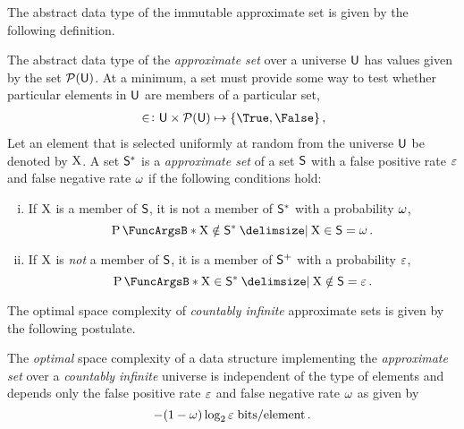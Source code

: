\documentclass[ ../main.tex]{subfiles}
\begin{document}
The abstract data type of the immutable approximate set\cite{aset} is given by the following definition.
\begin{definition}
\label{def:approx_set}
The abstract data type of the \emph{approximate set} over a universe $\Set{U}$ has values given by the set $\PowerSet(\Set{U})$. At a minimum, a set must provide some way to test whether particular elements in $\Set{U}$ are members of a particular set,
\begin{align}
    &\SetContains \colon \Set{U} \times \PowerSet(\Set{U}) \mapsto \{ \True, \False \}\,,\\
\end{align}
Let an element that is selected uniformly at random from the universe $\Set{U}$ be denoted by $\RV{X}$. A set $\ASet{S}$ is a \emph{approximate set} of a set $\Set{S}$ with a false positive rate $\fprate$ and false negative rate $\fnrate$ if the following conditions hold:
\begin{enumerate}[(i)]
    \item If $\RV{X}$ is a member of $\Set{S}$, it is not a member of $\ASet{S}$ with a probability $\fnrate$,
    \begin{equation}
        \Prob{\SetNotContains[\RV{X}][\ASet{S}] \Given \SetContains[\RV{X}][\Set{S}]} = \fnrate\,.
    \end{equation}
    
    \item If $\RV{X}$ is \emph{not} a member of $\Set{S}$, it is a member of $\PASet{S}$ with a probability $\fprate$,
    \begin{equation}
        \Prob{\SetContains[\RV{X}][\ASet{S}] \Given \SetNotContains[\RV{X}][\Set{S}]} = \fprate\,.
    \end{equation}
\end{enumerate}
\end{definition}

The optimal space complexity of \emph{countably infinite} approximate sets is given by the following postulate.
\begin{postulate}
The \emph{optimal} space complexity of a data structure implementing the \emph{approximate set} over a \emph{countably infinite} universe is independent of the type of elements and depends only the false positive rate $\fprate$ and false negative rate $\fnrate$ as given by
\begin{equation}
    -(1 - \fnrate) \log_2 \fprate \; \si{bits \per element}\,.
\end{equation}
\end{postulate}
\end{document}
